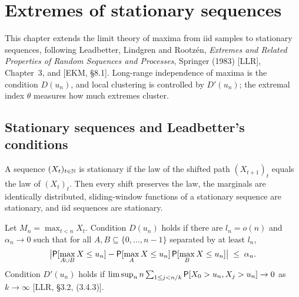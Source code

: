 \chapter{Extremes of stationary sequences}
\label{chap:dependence}

This chapter extends the limit theory of maxima from iid samples to stationary sequences, following
Leadbetter, Lindgren and Rootz\'en, \emph{Extremes and Related Properties of Random Sequences and
Processes}, Springer (1983) [LLR], Chapter~3, and [EKM, \S8.1]. Long-range independence of
maxima is the condition $D(u_n)$, and local clustering is controlled by $D'(u_n)$; the extremal
index $\theta$ measures how much extremes cluster.

\section{Stationary sequences and Leadbetter's conditions}

\begin{definition}
  \label{def:stationary}
  \leanok
  A sequence $(X_t)_{t \in \mathbb{N}}$ is stationary if the law of the shifted path $(X_{t+1})_t$
  equals the law of $(X_t)_t$. Then every shift preserves the law, the marginals are identically
  distributed, sliding-window functions of a stationary sequence are stationary, and iid sequences
  are stationary.
\end{definition}

\begin{definition}
  \label{def:leadbetter}
  \leanok
  Let $M_n = \max_{t < n} X_t$. Condition $D(u_n)$ holds if there are $l_n = o(n)$ and
  $\alpha_n \to 0$ such that for all $A, B \subseteq \{0, \dots, n-1\}$ separated by at least $l_n$,
  \begin{align*}
    \big| \mathsf{P}[\max_{A \cup B} X \le u_n] - \mathsf{P}[\max_A X \le u_n] \, \mathsf{P}[\max_B X \le u_n] \big|
      \; \le \; \alpha_n .
  \end{align*}
  Condition $D'(u_n)$ holds if
  $\limsup_n n \sum_{1 \le j < n/k} \mathsf{P}[X_0 > u_n, X_j > u_n] \to 0$ as $k \to \infty$
  [LLR, \S3.2, (3.4.3)].
\end{definition}

